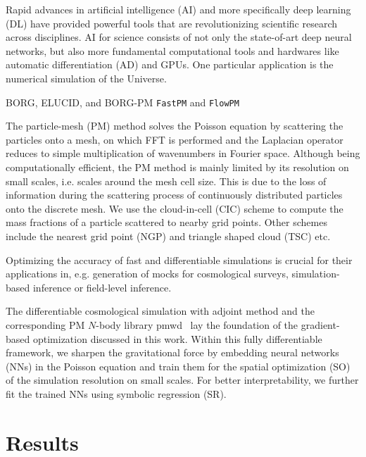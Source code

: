 \documentclass[modern, trackchanges, dvipsnames]{aastex631}
\newcommand{\pmwd}{{\usefont{T1}{nova}{m}{sl}pmwd}}
\begin{document}
Rapid advances in artificial intelligence (AI) and more specifically
deep learning (DL) have provided powerful tools that are revolutionizing
scientific research across disciplines.
AI for science consists of not only the state-of-art deep neural
networks, but also more fundamental computational tools and hardwares
like automatic differentiation (AD) and GPUs.
One particular application is the numerical simulation of the Universe.

BORG, ELUCID, and BORG-PM \citep{BORG, ELUCID, BORG-PM}
\texttt{FastPM} and \texttt{FlowPM} \citep{FastPM, vmad, SeljakEtAl2017, FlowPM}


The particle-mesh (PM) method solves the Poisson equation by scattering
the particles onto a mesh, on which FFT is performed and the Laplacian
operator reduces to simple multiplication of wavenumbers in Fourier
space.
Although being computationally efficient, the PM method is mainly
limited by its resolution on small scales, i.e. scales around the mesh
cell size.
This is due to the loss of information during the scattering process of
continuously distributed particles onto the discrete mesh.
We use the cloud-in-cell (CIC) scheme \citep{HockneyEastwood1988} to
compute the mass fractions of a particle scattered to nearby grid
points.
Other schemes include the nearest grid point (NGP) and triangle shaped
cloud (TSC) etc.

Optimizing the accuracy of fast and differentiable simulations is
crucial for their applications in, e.g. generation of mocks for
cosmological surveys, simulation-based inference or field-level
inference.

The differentiable cosmological simulation with adjoint method
\citep{Li2022a} and the corresponding PM $N$-body library \pmwd\
\citep{Li2022b} lay the foundation of the gradient-based optimization
discussed in this work.
Within this fully differentiable framework, we sharpen the gravitational
force by embedding neural networks (NNs) in the Poisson equation and
train them for the spatial optimization (SO) of the simulation
resolution on small scales.
For better interpretability, we further fit the trained NNs using
symbolic regression (SR).



\vspace{1em}
\section{Results}
\end{document}
